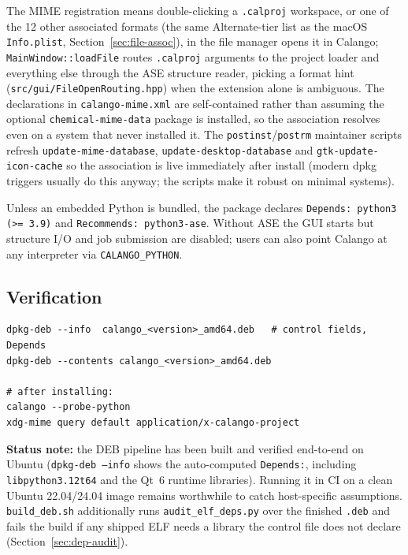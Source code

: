 \documentclass[11pt,a4paper]{article}
\newcommand{\file}[1]{\texttt{#1}}
\newcommand{\opt}[1]{\texttt{#1}}
\begin{document}
The MIME registration means double-clicking a \file{.calproj} workspace,
or one of the 12 other associated formats (the same Alternate-tier list
as the macOS \file{Info.plist}, Section~\ref{sec:file-assoc}), in the
file manager opens it in Calango; \file{MainWindow::loadFile}
routes \file{.calproj} arguments to the project loader and everything
else through the ASE structure reader, picking a format hint
(\file{src/gui/FileOpenRouting.hpp}) when the extension alone is
ambiguous. The declarations in \file{calango-mime.xml} are
self-contained rather than assuming the optional
\texttt{chemical-mime-data} package is installed, so the association
resolves even on a system that never installed it. The
\file{postinst}/\file{postrm} maintainer scripts refresh
\file{update-mime-database}, \file{update-desktop-database} and
\file{gtk-update-icon-cache} so the association is live immediately
after install (modern dpkg triggers usually do this anyway; the scripts
make it robust on minimal systems).

Unless an embedded Python is bundled, the package declares
\texttt{Depends: python3 (>= 3.9)} and \texttt{Recommends: python3-ase}.
Without ASE the GUI starts but structure I/O and job submission are
disabled; users can also point Calango at any interpreter via
\texttt{CALANGO\_PYTHON}.

\subsection{Verification}

\begin{lstlisting}
dpkg-deb --info  calango_<version>_amd64.deb   # control fields, Depends
dpkg-deb --contents calango_<version>_amd64.deb

# after installing:
calango --probe-python
xdg-mime query default application/x-calango-project
\end{lstlisting}

\noindent
\textbf{Status note:} the DEB pipeline has been built and verified
end-to-end on Ubuntu (\file{dpkg-deb --info} shows the auto-computed
\texttt{Depends:}, including \opt{libpython3.12t64} and the Qt~6 runtime
libraries). Running it in CI on a clean Ubuntu 22.04/24.04 image remains
worthwhile to catch host-specific assumptions. \file{build\_deb.sh}
additionally runs \file{audit\_elf\_deps.py} over the finished
\file{.deb} and fails the build if any shipped ELF needs a library the
control file does not declare (Section~\ref{sec:dep-audit}).
\end{document}
